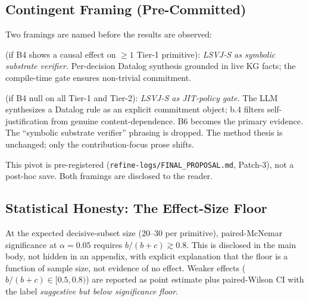 \documentclass{article}
\theoremstyle{definition}
\begin{document}
\subsection{Contingent Framing (Pre-Committed)}
\label{sec:disc:pivot}
Two framings are named before the results are observed:
\begin{description}[style=nextline]
\item[Primary framing] (if B4 shows a causal effect on $\ge 1$
Tier-1 primitive): \emph{LSVJ-S as symbolic substrate verifier.}
Per-decision Datalog synthesis grounded in live KG facts; the
compile-time gate ensures non-trivial commitment.
\item[Fallback framing] (if B4 null on all Tier-1 and Tier-2):
\emph{LSVJ-S as JIT-policy gate.} The LLM synthesizes a Datalog
rule as an explicit commitment object; b.4 filters self-justification
from genuine content-dependence. B6 becomes the primary evidence.
The ``symbolic substrate verifier'' phrasing is dropped. The method
thesis is unchanged; only the contribution-focus prose shifts.
\end{description}
This pivot is pre-registered
(\texttt{refine-logs/FINAL\_PROPOSAL.md}, Patch-3), not a post-hoc
save. Both framings are disclosed to the reader.

\subsection{Statistical Honesty: The Effect-Size Floor}
At the expected decisive-subset size (20--30 per primitive),
paired-McNemar significance at $\alpha = 0.05$ requires
$b/(b+c) \gtrsim 0.8$. This is disclosed in the main body, not hidden
in an appendix, with explicit explanation that the floor is a
function of sample size, not evidence of no effect. Weaker effects
($b/(b+c) \in [0.5, 0.8)$) are reported as point estimate plus
paired-Wilson CI with the label \emph{suggestive but below
significance floor}.
\end{document}
